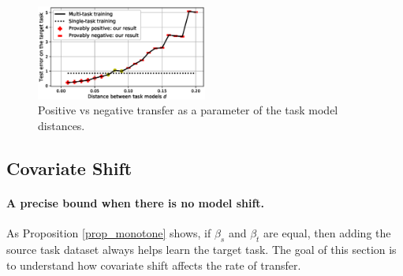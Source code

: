 \begin{figure}
	\centering
	\includegraphics[width=0.5\textwidth]{figures/model_shift_phase_transition.eps}
	\caption{Positive vs negative transfer as a parameter of the task model distances.}
	\label{fig_model_shift_phasetrans}
\end{figure}









\subsection{Covariate Shift}


\paragraph{A precise bound when there is no model shift.}
As Proposition \ref{prop_monotone} shows, if $\beta_s$ and $\beta_t$ are equal, then adding the source task dataset always helps learn the target task.
The goal of this section is to understand how covariate shift affects the rate of transfer. 


